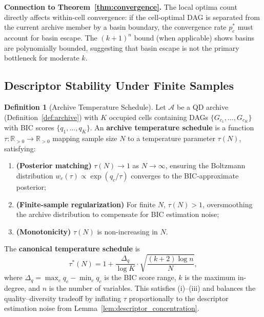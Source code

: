 \documentclass{article}
\theoremstyle{definition}
\newtheorem{definition}{Definition}
\theoremstyle{plain}
\theoremstyle{remark}
\begin{document}
\textbf{Connection to Theorem~\ref{thm:convergence}.} The local optima count directly
affects within-cell convergence: if the cell-optimal DAG is separated from the current
archive member by a basin boundary, the convergence rate $p_c^*$ must account for basin
escape. The $(k+1)^n$ bound (when applicable) shows basins are polynomially bounded,
suggesting that basin escape is not the primary bottleneck for moderate $k$.


\subsection{Descriptor Stability Under Finite Samples}
\label{subsec:descriptor_stability}

\begin{definition}[Archive Temperature Schedule]
\label{def:temperature_schedule}
Let $\mathcal{A}$ be a QD archive (Definition~\ref{def:archive}) with $K$ occupied cells
containing DAGs $\{G_{c_1}, \ldots, G_{c_K}\}$ with BIC scores $\{q_1, \ldots, q_K\}$.
An \textbf{archive temperature schedule} is a function $\tau : \mathbb{R}_{>0} \to \mathbb{R}_{>0}$
mapping sample size $N$ to a temperature parameter $\tau(N)$, satisfying:
\begin{enumerate}
  \item[(i)] \textbf{(Posterior matching)} $\tau(N) \to 1$ as $N \to \infty$, ensuring the
    Boltzmann distribution $w_c(\tau) \propto \exp(q_c / \tau)$ converges to the BIC-approximate
    posterior;
  \item[(ii)] \textbf{(Finite-sample regularization)} For finite $N$, $\tau(N) > 1$,
    oversmoothing the archive distribution to compensate for BIC estimation noise;
  \item[(iii)] \textbf{(Monotonicity)} $\tau(N)$ is non-increasing in $N$.
\end{enumerate}

The \textbf{canonical temperature schedule} is
\begin{equation}
  \tau^*(N) = 1 + \frac{\Delta_q}{\log K} \cdot \sqrt{\frac{(k+2)\log n}{N}},
\end{equation}
where $\Delta_q = \max_c q_c - \min_c q_c$ is the BIC score range, $k$ is the maximum
in-degree, and $n$ is the number of variables. This satisfies (i)--(iii) and balances the
quality--diversity tradeoff by inflating $\tau$ proportionally to the descriptor estimation
noise from Lemma~\ref{lem:descriptor_concentration}.
\end{definition}
\end{document}
